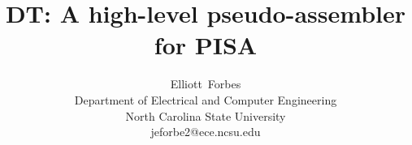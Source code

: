 \documentclass[10pt,conference,twocolumn,letterpaper]{IEEEtran}
\begin{document}
%
\title{DT: A high-level pseudo-assembler for PISA}


%


\ifCLASSOPTIONpeerreview
\else
\author{Elliott~Forbes\\Department of Electrical
        and Computer Engineering\\North Carolina State University\\
        jeforbe2@ece.ncsu.edu}%
\fi

% 



\end{document}

